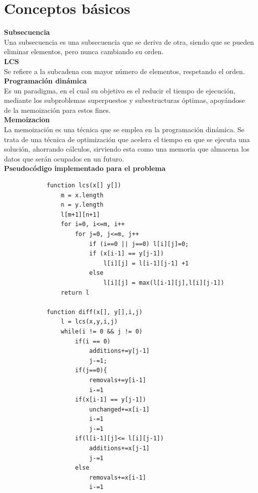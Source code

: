 \documentclass{article}
\begin{document}
\section{Conceptos básicos}
    \textbf{Subsecuencia}\\
    Una subsecuencia es una subsecuencia que se deriva de otra, siendo que se pueden eliminar elementos, pero nunca cambiando su orden.\cite{2}\\
    \textbf{LCS}\\
    Se refiere a la subcadena con mayor número de elementos, respetando el orden.\cite{2}\\
    \textbf{Programación dinámica}\\
    Es un paradigma, en el cual su objetivo es el reducir el tiempo de ejecución, mediante los subproblemas superpuestos y subestructuras óptimas, apoyándose de la memoización para estos fines.\cite{3}\\
    \textbf{Memoizacion}\\
    La memoización es una técnica que se emplea en la programación dinámica. Se trata de una técnica de optimización que acelera el tiempo en que se ejecuta una solución, ahorrando cálculos, sirviendo esta como una memoria que almacena los datos que serán ocupados en un futuro.\cite{3}\\
   
 
    \textbf{Pseudocódigo implementado para el problema}
        \begin{verbatim}
            function lcs(x[] y[])
                m = x.length
                n = y.length
                l[m+1][n+1]
                for i=0, i<=m, i++
                    for j=0, j<=m, j++
                        if (i==0 || j==0) l[i][j]=0;
                        if (x[i-1] == y[j-1])
                            l[i][j] = l[i-1][j-1] +1
                        else
                            l[i][j] = max(l[i-1][j],l[i][j-1])
                return l
            
            function diff(x[], y[],i,j)
                l = lcs(x,y,i,j)
                while(i != 0 && j != 0)
                    if(i == 0)
                        additions+=y[j-1]         
                        j-=1;
                    if(j==0){
                        removals+=y[i-1]
                        i-=1
                    if(x[i-1] == y[j-1])
                        unchanged+=x[i-1]
                        i-=1
                        j-=1
                    if(l[i-1][j]<= l[i][j-1])
                        additions+=x[j-1]
                        j-=1
                    else
                        removals+=x[i-1]
                        i-=1
                    
            
        \end{verbatim}
        \newpage
\end{document}
